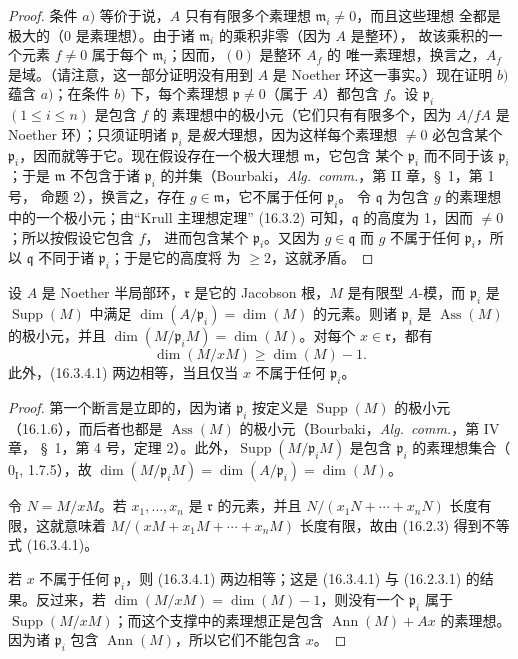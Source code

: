 \begin{proof}
条件 $a)$ 等价于说，$A$ 只有有限多个素理想 $\mathfrak{m}_i\neq0$，而且这些理想
全都是极大的（$0$ 是素理想）。由于诸 $\mathfrak{m}_i$ 的乘积非零（因为 $A$ 是整环），
故该乘积的一个元素 $f\neq0$ 属于每个 $\mathfrak{m}_i$；因而，$(0)$ 是整环 $A_f$ 的
唯一素理想，换言之，$A_f$ 是域。（请注意，这一部分证明没有用到 $A$ 是
Noether 环这一事实。）现在证明 $b)$ 蕴含 $a)$；在条件 $b)$ 下，每个素理想
$\mathfrak{p}\neq0$（属于 $A$）都包含 $f$。设 $\mathfrak{p}_i$ $(1\leq i\leq n)$ 是包含 $f$ 的
素理想中的极小元（它们只有有限多个，因为 $A/fA$ 是 Noether 环）；只须证明诸
$\mathfrak{p}_i$ 是\emph{极大}理想，因为这样每个素理想 $\neq0$ 必包含某个
$\mathfrak{p}_i$，因而就等于它。现在假设存在一个极大理想 $\mathfrak{m}$，它包含
某个 $\mathfrak{p}_i$ 而不同于该 $\mathfrak{p}_i$；于是 $\mathfrak{m}$ 不包含于诸
$\mathfrak{p}_i$ 的并集（Bourbaki，\emph{Alg.~comm.}，第 II 章，\S~1，第 1 号，
命题 2），换言之，存在 $g\in\mathfrak{m}$，它不属于任何 $\mathfrak{p}_i$。
令 $\mathfrak{q}$ 为包含 $g$ 的素理想中的一个极小元；由“Krull 主理想定理”
(16.3.2) 可知，$\mathfrak{q}$ 的高度为 1，因而 $\neq0$；所以按假设它包含 $f$，
进而包含某个 $\mathfrak{p}_i$。又因为 $g\in\mathfrak{q}$ 而 $g$ 不属于任何
$\mathfrak{p}_i$，所以 $\mathfrak{q}$ 不同于诸 $\mathfrak{p}_i$；于是它的高度将
为 $\geq2$，这就矛盾。
\end{proof}

\begin{proposition}[16.3.4]
\label{0.16.3.4-fr}
设 $A$ 是 Noether 半局部环，$\mathfrak{r}$ 是它的 Jacobson 根，$M$ 是有限型
$A$-模，而 $\mathfrak{p}_i$ 是 $\operatorname{Supp}(M)$ 中满足
$\dim(A/\mathfrak{p}_i)=\dim(M)$ 的元素。则诸 $\mathfrak{p}_i$ 是
$\operatorname{Ass}(M)$ 的极小元，并且
$\dim(M/\mathfrak{p}_iM)=\dim(M)$。对每个 $x\in\mathfrak{r}$，都有
\begin{equation}
\label{0.16.3.4.1-fr}
\tag{16.3.4.1}
  \dim(M/xM)\geq\dim(M)-1.
\end{equation}
此外，(16.3.4.1) 两边相等，当且仅当 $x$ 不属于任何 $\mathfrak{p}_i$。
\end{proposition}

\begin{proof}
第一个断言是立即的，因为诸 $\mathfrak{p}_i$ 按定义是
$\operatorname{Supp}(M)$ 的极小元（16.1.6），而后者也都是
$\operatorname{Ass}(M)$ 的极小元（Bourbaki，\emph{Alg.~comm.}，第 IV 章，
\S~1，第 4 号，定理 2）。此外，$\operatorname{Supp}(M/\mathfrak{p}_iM)$
是包含 $\mathfrak{p}_i$ 的素理想集合（$0_{\mathrm I}$, 1.7.5），故
$\dim(M/\mathfrak{p}_iM)=\dim(A/\mathfrak{p}_i)=\dim(M)$。

令 $N=M/xM$。若 $x_1,\ldots,x_n$ 是 $\mathfrak{r}$ 的元素，并且
$N/(x_1N+\cdots+x_nN)$ 长度有限，这就意味着
$M/(xM+x_1M+\cdots+x_nM)$ 长度有限，故由 (16.2.3) 得到不等式 (16.3.4.1)。

若 $x$ 不属于任何 $\mathfrak{p}_i$，则 (16.3.4.1) 两边相等；这是 (16.3.4.1)
与 (16.2.3.1) 的结果。反过来，若
$\dim(M/xM)=\dim(M)-1$，则没有一个 $\mathfrak{p}_i$ 属于
$\operatorname{Supp}(M/xM)$；而这个支撑中的素理想正是包含
$\operatorname{Ann}(M)+Ax$ 的素理想。因为诸 $\mathfrak{p}_i$ 包含
$\operatorname{Ann}(M)$，所以它们不能包含 $x$。
\end{proof}

